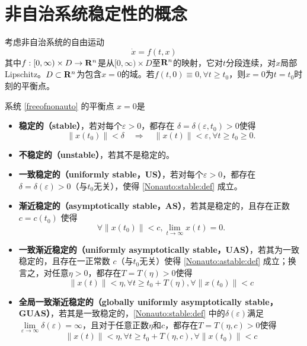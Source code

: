 \section{非自治系统稳定性的概念}\label{3Bref}
考虑非自治系统的自由运动
\begin{equation}\label{freeofnonauto}
  \dot{x}=f(t,x)
\end{equation}
其中$f : [0, \infty) \times D \rightarrow \mathbf{R}{}^n$是从$[0, \infty) \times D$至$\mathbf{R}{}^n$的映射，它对$t$分段连续，对$x$局部Lipschitz。$D\subset\mathbf{R}{}^n$为包含$x=0$的域。若$f(t,0)\equiv0,\forall t\ge t_0$，则$x=0$为$t=t_0$时刻的平衡点。
\begin{definition}[非自治系统的稳定性]
 系统 \eqref{freeofnonauto} 的平衡点 $x = 0$是
  \begin{itemize}[leftmargin=1em]
    \item {\bf 稳定的（stable）}，若对每个$\varepsilon > 0$，都存在 $\delta =    \delta (\varepsilon, t_0)>0$使得
    \begin{equation}
      \| x (t_0) \| < \delta \quad \Rightarrow \quad \| x (t) \| <
      \varepsilon, \forall t \geq t_0 \geq 0 \label{Nonauto:stable:def} .
    \end{equation}
    \item {\bf 不稳定的（unstable）}，若其不是稳定的。
    
    \item {\bf 一致稳定的（uniformly stable，US）}，若对每个$\varepsilon > 0$，都存在
    $\delta = \delta (\varepsilon) > 0$（与$t_0$无关），使得 \eqref{Nonauto:stable:def} 成立。
    
    \item {\bf 渐近稳定的（asymptotically stable，AS）}，若其是稳定的，且存在正数
     $c = c (t_0)$ 使得
    \begin{equation}
      \forall \| x (t_0) \| < c, \lim_{t \rightarrow \infty} x (t) = 0 \label{Nonauto:astable:def} .
    \end{equation}
    \item {\bf 一致渐近稳定的（uniformly asymptotically stable，UAS）}，若其为一致稳定的，且存在一正常数 $c$（与$t_0$无关）使得 \eqref{Nonauto:astable:def} 成立；换言之，对任意$\eta>0$，都存在$T=T(\eta)>0$使得
    \[\|x(t)\|<\eta,\forall t\ge t_0+T(\eta),\forall\|x(t_0)\|<c\]
    
    \item {\bf 全局一致渐近稳定的（globally uniformly asymptotically stable，GUAS）}，若其是一致稳定的，\eqref{Nonauto:stable:def} 中的$\delta(\varepsilon)$满足$\lim\limits_{\varepsilon\to\infty}\delta(\varepsilon)=\infty$，且对于任意正数$\eta$和$c$，都存在$T=T(\eta,c)>0$使得
    \[\|x(t)\|<\eta,\forall t\ge t_0+T(\eta,c),\forall\|x(t_0)\|<c\]
  \end{itemize}
\end{definition}
